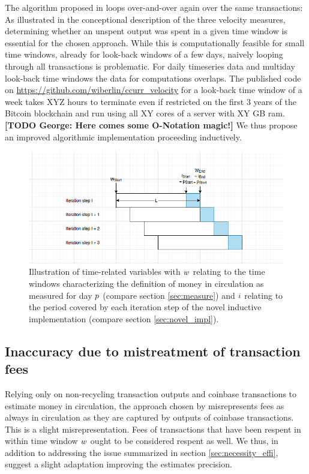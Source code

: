 The algorithm proposed in \cite{pernice2019cryptocurrencies} loops over-and-over again over the same transactions: %
As illustrated in the conceptional description of the three velocity measures, determining whether an unspent output was spent in a given time window is essential for the chosen approach. %
While this is computationally feasible for small time windows, already for look-back windows of a few days, naively looping through all transactions is problematic. %
For daily timeseries data and multiday look-back time windows the data for computations overlaps. %
The published code on \url{https://github.com/wiberlin/ccurr_velocity} for a look-back time window of a week takes XYZ hours to terminate even if restricted on the first 3 years of the Bitcoin blockchain and run using all XY cores of a server with XY GB ram. 
\textbf{[TODO George: Here comes some O-Notation magic!]}
We thus propose an improved algorithmic implementation proceeding inductively. %


\begin{figure}
  \centerline{%
    \ifdefined\varInputFigs%
    \includegraphics[width=0.8\linewidth]{fig/period_variables}%
    \else%
    \fi%
  }%
  \caption{Illustration of time-related variables with \({w}\) relating to the time windows characterizing the definition of money in circulation as measured for day \({p}\) (compare section \ref{sec:measure}) and \({i}\) relating to the period covered by each iteration step of the novel inductive implementation (compare section \ref{sec:novel_impl}).}
  \label{fig:timevars}
\end{figure}
%

\subsection{Inaccuracy due to mistreatment of transaction fees}
\label{sec:inaccuracy_fees}%
Relying only on non-recycling transaction outputs and coinbase transactions to estimate money in circulation, the approach chosen by \cite{pernice2019cryptocurrencies} misrepresents fees as always in circulation as they are captured by outputs of coinbase transactions. %
This is a slight misrepresentation. %
Fees of transactions that have been respent in within time window \({w}\) ought to be considered respent as well. %
We thus, in addition to addressing the issue summarized in section \ref{sec:necessity_effi}, suggest a slight adaptation improving the estimates precision. %

